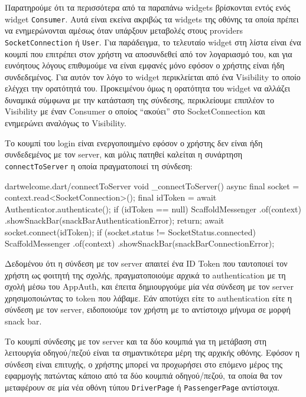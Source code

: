 \documentclass[../thesis.tex]{subfiles}
\begin{document}
Παρατηρούμε ότι τα περισσότερα από τα παραπάνω widgets βρίσκονται εντός ενός widget \texttt{Consumer}.
Αυτά είναι εκείνα ακριβώς τα widgets της οθόνης τα οποία πρέπει να ενημερώνονται αμέσως όταν υπάρξουν μεταβολές στους providers \texttt{SocketConnection} ή \texttt{User}.
Για παράδειγμα, το τελευταίο widget στη λίστα είναι ένα κουμπί που επιτρέπει στον χρήστη να αποσυνδεθεί από τον λογαριασμό του, και για ευνόητους λόγους επιθυμούμε να είναι εμφανές μόνο εφόσον ο χρήστης είναι ήδη συνδεδεμένος.
Για αυτόν τον λόγο το widget περικλείεται από ένα Visibility το οποίο ελέγχει την ορατότητά του.
Προκειμένου όμως η ορατότητα του widget να αλλάζει δυναμικά σύμφωνα με την κατάσταση της σύνδεσης, περικλείουμε επιπλέον το Visibility με έναν Consumer ο οποίος ``ακούει'' στο SocketConnection και ενημερώνει αναλόγως το Visibility.

Το κουμπί του login είναι ενεργοποιημένο εφόσον ο χρήστης δεν είναι ήδη συνδεδεμένος με τον server, και μόλις πατηθεί καλείται η συνάρτηση \texttt{connect\-To\-Server} η οποία πραγματοποιεί τη σύνδεση:

\begin{codeblock}{dart}{welcome.dart/connectToServer}
  void _connectToServer() async {
    final socket = context.read<SocketConnection>();
    final idToken = await Authenticator.authenticate();
    if (idToken == null) {
      ScaffoldMessenger
        .of(context)
        .showSnackBar(snackBarAuthenticationError);
      return;
    }
    await socket.connect(idToken);
    if (socket.status != SocketStatus.connected) {
      ScaffoldMessenger
        .of(context)
        .showSnackBar(snackBarConnectionError);
    }
  }
\end{codeblock}

Δεδομένου ότι η σύνδεση με τον server απαιτεί ένα ID Token που ταυτοποιεί τον χρήστη ως φοιτητή της σχολής, πραγματοποιούμε αρχικά το authentication με τη σχολή μέσω του AppAuth, και έπειτα δημιουργούμε μία νέα σύνδεση με τον server χρησιμοποιώντας το token που λάβαμε.
Εάν αποτύχει είτε το authentication είτε η σύνδεση με τον server, ειδοποιούμε τον χρήστη με το αντίστοιχο μήνυμα σε μορφή snack bar.

\bigskip

Το κουμπί σύνδεσης με τον server και τα δύο κουμπιά για τη μετάβαση στη λειτουργία οδηγού/πεζού είναι τα σημαντικότερα μέρη της αρχικής οθόνης.
Εφόσον η σύνδεση είναι επιτυχής, ο χρήστης μπορεί να προχωρήσει στο επόμενο μέρος της εφαρμογής πατώντας κάποιο από τα δύο κουμπιά οδηγού/πεζού, τα οποία θα τον μεταφέρουν σε μία νέα οθόνη τύπου \texttt{DriverPage} ή \texttt{PassengerPage} αντίστοιχα.
\end{document}
